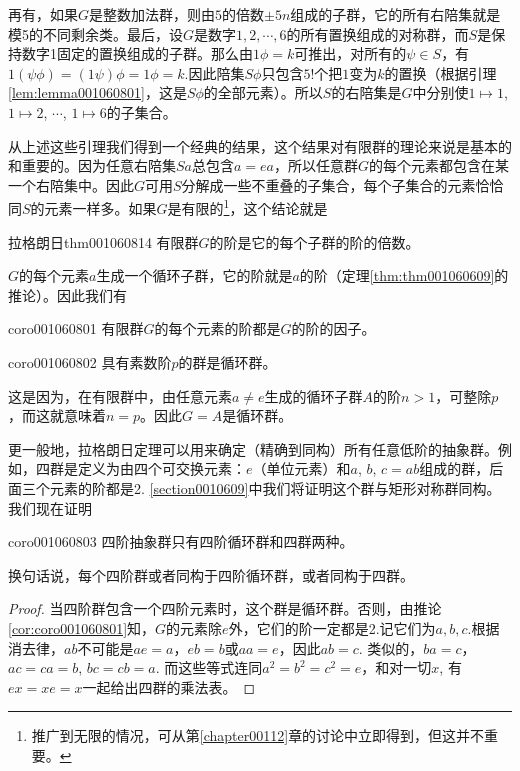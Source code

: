 再有，如果$G$是整数加法群，则由$5$的倍数$\pm{}5n$组成的子群，它的所有右陪集就是模5的不同剩余类。最后，设$G$是数字$1,2,\cdots,6$的所有置换组成的对称群，而$S$是保持数字1固定的置换组成的子群。那么由$1\phi=k$可推出，对所有的$\psi \in S$，有$1(\psi\phi)=(1\psi)\phi = 1\phi = k$.因此陪集$S\phi$只包含$5!$个把$1$变为$k$的置换（根据引理\ref{lem:lemma001060801}，这是$S\phi$的全部元素）。所以$S$的右陪集是$G$中分别使$1 \mapsto 1$, $1\mapsto 2$, $\cdots$, $1 \mapsto 6$的子集合。

从上述这些引理我们得到一个经典的结果，这个结果对有限群的理论来说是基本的和重要的。因为任意右陪集$Sa$总包含$a=ea$，所以任意群$G$的每个元素都包含在某一个右陪集中。因此$G$可用$S$分解成一些不重叠的子集合，每个子集合的元素恰恰同$S$的元素一样多。如果$G$是有限的\footnote{推广到无限的情况，可从第\ref{chapter00112}章的讨论中立即得到，但这并不重要。}，这个结论就是
\begin{theorem}{拉格朗日}{thm001060814}
有限群$G$的阶是它的每个子群的阶的倍数。
\end{theorem}

$G$的每个元素$a$生成一个循环子群，它的阶就是$a$的阶（定理\ref{thm:thm001060609}的推论）。因此我们有

\begin{corollary}{}{coro001060801}
有限群$G$的每个元素的阶都是$G$的阶的因子。
\end{corollary}

\begin{corollary}{}{coro001060802}
具有素数阶$p$的群是循环群。
\end{corollary}

这是因为，在有限群中，由任意元素$a \neq e$生成的循环子群$A$的阶$n > 1$，可整除$p$，而这就意味着$n=p$。因此$G=A$是循环群。

更一般地，拉格朗日定理可以用来确定（精确到同构）所有任意低阶的抽象群。例如，四群是定义为由四个可交换元素：$e$（单位元素）和$a$, $b$, $c=ab$组成的群，后面三个元素的阶都是2. \ref{section0010609}中我们将证明这个群与矩形对称群同构。我们现在证明
\begin{corollary}{}{coro001060803}
四阶抽象群只有四阶循环群和四群两种。
\end{corollary}

换句话说，每个四阶群或者同构于四阶循环群，或者同构于四群。

\begin{proof}
当四阶群包含一个四阶元素时，这个群是循环群。否则，由推论\ref{cor:coro001060801}知，$G$的元素除$e$外，它们的阶一定都是2.记它们为$a,b,c$.根据消去律，$ab$不可能是$ae=a$，$eb=b$或$aa=e$，因此$ab=c$. 类似的，$ba=c$，$ac=ca=b$, $bc=cb=a$. 而这些等式连同$a^2=b^2=c^2=e$，和对一切$x$, 有$ex=xe=x$一起给出四群的乘法表。
\end{proof}

